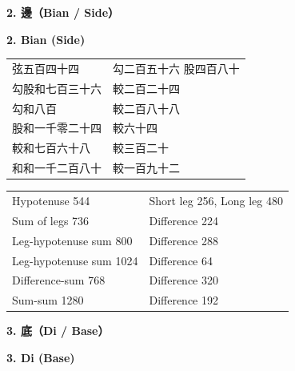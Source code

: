\documentclass[11pt,a4paper]{article}
\newlength{\chwidth}
\newlength{\enwidth}
\newcommand{\zh}[1]{{\CJKfamily{sf}#1}}
\newenvironment{bilingual}{%
  \noindent
  \begin{minipage}[t]{\chwidth}%
  \small
}{%
  \end{minipage}%
}
\newcommand{\switchcolumn}{%
  \end{minipage}%
  \hfill%
  \begin{minipage}[t]{\enwidth}%
  \small
}
\newcommand{\bilingualpair}[2]{%
  \noindent
  \begin{minipage}[t]{\chwidth}%
  \small\zh{#1}%
  \end{minipage}%
  \hfill
  \begin{minipage}[t]{\enwidth}%
  \small #2%
  \end{minipage}%
  \par\vspace{0.3cm}
}
\begin{document}
\vspace{0.3cm}

\noindent\bilingualpair{\textbf{\zh{2. 邊（Bian / Side）}}}{\textbf{2. Bian (Side)}}

\begin{bilingual}
\begin{center}
\zh{
\begin{tabular}{ll}
弦五百四十四 & 勾二百五十六 \quad 股四百八十 \\
勾股和七百三十六 & 較二百二十四 \\
勾和八百 & 較二百八十八 \\
股和一千零二十四 & 較六十四 \\
較和七百六十八 & 較三百二十 \\
和和一千二百八十 & 較一百九十二 \\
\end{tabular}
}
\end{center}

\switchcolumn

\begin{center}
\begin{tabular}{ll}
Hypotenuse 544 & Short leg 256, Long leg 480 \\
Sum of legs 736 & Difference 224 \\
Leg-hypotenuse sum 800 & Difference 288 \\
Leg-hypotenuse sum 1024 & Difference 64 \\
Difference-sum 768 & Difference 320 \\
Sum-sum 1280 & Difference 192 \\
\end{tabular}
\end{center}
\end{bilingual}

\vspace{0.3cm}

\noindent\bilingualpair{\textbf{\zh{3. 底（Di / Base）}}}{\textbf{3. Di (Base)}}
\end{document}
